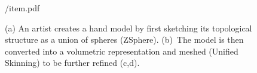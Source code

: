 \providecommand{\yoff}{0}
\begin{figure}[t!]
\centering
\begin{overpic} 
[width=\linewidth]
{\currfiledir/item.pdf}
\end{overpic}
\caption{
% 
%
(a) An artist creates a hand model by first sketching its topological structure as a union of spheres (ZSphere{}). (b)~The model is then converted into a volumetric representation and meshed (Unified Skinning) to be further refined (c,d).
% 
% 
}
\label{fig:zsphere}
\end{figure}